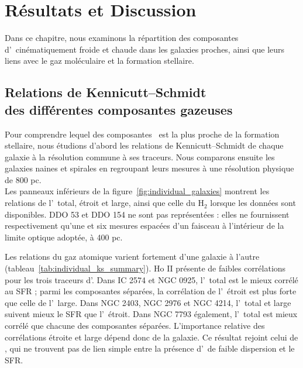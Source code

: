 \chapter{Résultats et Discussion}

Dans ce chapitre, nous examinons la répartition des composantes d'\HI\ cinématiquement froide et chaude dans les galaxies proches, ainsi que leurs liens avec le gaz moléculaire et la formation stellaire.


%

\begingroup
\raggedbottom
\setlength{\intextsep}{6pt}
\section[Relations de Kennicutt--Schmidt des différentes composantes gazeuses]{Relations de Kennicutt--Schmidt\\des différentes composantes gazeuses}
\label{sec:ks_individual_results}
Pour comprendre lequel des composantes \HI\ est la plus proche de la formation stellaire, nous étudions d'abord les relations de Kennicutt--Schmidt de chaque galaxie à la résolution commune à ses traceurs. Nous comparons ensuite les galaxies naines et spirales en regroupant leurs mesures à une résolution physique de 800 pc.\\\indent
Les panneaux inférieurs de la figure~\ref{fig:individual_galaxies} montrent les relations de l'\HI\ total, étroit et large, ainsi que celle du H$_2$ lorsque les données sont disponibles. DDO 53 et DDO 154 ne sont pas représentées : elles ne fournissent respectivement qu'une et six mesures espacées d'un faisceau à l'intérieur de la limite optique adoptée, à 400 pc.

Les relations du gaz atomique varient fortement d'une galaxie à l'autre (tableau~\ref{tab:individual_ks_summary}). Ho II présente de faibles corrélations pour les trois traceurs d'\HI. Dans IC 2574 et NGC 0925, l'\HI\ total est le mieux corrélé au SFR ; parmi les composantes séparées, la corrélation de l'\HI\ étroit est plus forte que celle de l'\HI\ large. Dans NGC 2403, NGC 2976 et NGC 4214, l'\HI\ total et large suivent mieux le SFR que l'\HI\ étroit. Dans NGC 7793 également, l'\HI\ total est mieux corrélé que chacune des composantes séparées. L'importance relative des corrélations étroite et large dépend donc de la galaxie. Ce résultat rejoint celui de \citet{Young2003}, qui ne trouvent pas de lien simple entre la présence d'\HI\ de faible dispersion et le SFR.

